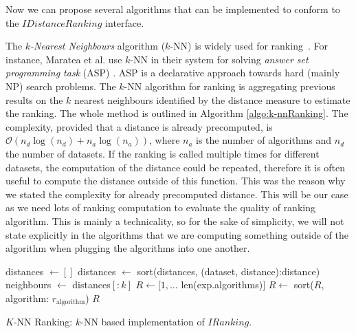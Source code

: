 Now we can propose several algorithms that can be implemented to conform to the $IDistanceRanking$ interface.

The \emph{$k$-Nearest Neighbours} algorithm ($k$-NN) \cite{knn} is widely used for ranking~\cite{BrazdilMetalearning-2009}. For instance, Maratea et al. use $k$-NN in their system for solving \emph{answer set programming task} (ASP) \cite{MarateaMEASPProgressReport,MarateaMeAsp}. ASP is a declarative approach towards hard (mainly NP) search problems. The $k$-NN algorithm for ranking is aggregating previous results on the $k$ nearest neighbours identified by the distance measure to estimate the ranking. The whole method is outlined in Algorithm \ref{algo:k-nnRanking}. The complexity, provided that a distance is already precomputed, is $\mathcal{O}(n_d\log(n_d)+n_a\log(n_a))$, where $n_a$ is the number of algorithms and $n_d$ the number of datasets. If the ranking is called multiple times for different datasets, the computation of the distance could be repeated, therefore it is often useful to compute the distance outside of this function. This was the reason why we stated the complexity for already precomputed distance. This will be our case as we need lots of ranking computation to evaluate the quality of ranking algorithm. This is mainly a technicality, so for the sake of simplicity, we will not state explicitly in the algorithms that we are computing something outside of the algorithm when plugging the algorithms into one another. 

\IncMargin{1em}
\begin{algorithm}
	\BlankLine	
	distances $\leftarrow []$\;
		distances $\leftarrow$ sort(distances, (dataset, distance):distance)\;
		neighbours $\leftarrow$ distances$[:k]$\;
	$R \leftarrow [1, \dots$ len(exp.algorithms)$]$\;
	$R \leftarrow$ sort($R$, algorithm: $r_{\text{algorithm}}$)\;
	\Return $R$\;
	\caption{$K$-NN Ranking: $k$-NN based implementation of $IRanking$.}
	\label{algo:k-nnRanking}
\end{algorithm}\DecMargin{1em}

